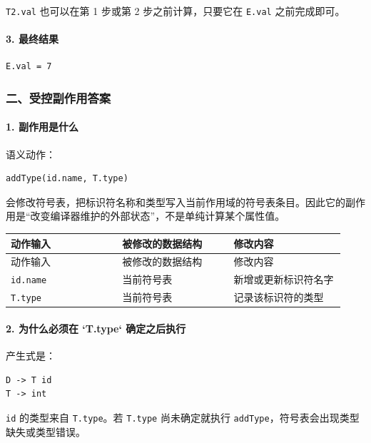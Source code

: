 \documentclass[UTF8]{ctexart}
\begin{document}
\texttt{T2.val} 也可以在第 1 步或第 2 步之前计算，只要它在 \texttt{E.val} 之前完成即可。

\paragraph*{3. 最终结果}

\begin{Verbatim}[fontsize=\small,breaklines=true]
E.val = 7
\end{Verbatim}

\subsubsection*{二、受控副作用答案}

\paragraph*{1. 副作用是什么}

语义动作：

\begin{Verbatim}[fontsize=\small,breaklines=true]
addType(id.name, T.type)
\end{Verbatim}

会修改符号表，把标识符名称和类型写入当前作用域的符号表条目。因此它的副作用是“改变编译器维护的外部状态”，不是单纯计算某个属性值。

\begin{longtable}{|p{0.31\linewidth}|p{0.31\linewidth}|p{0.31\linewidth}|}
\hline
动作输入 & 被修改的数据结构 & 修改内容 \\
\hline
\endfirsthead
动作输入 & 被修改的数据结构 & 修改内容 \\
\hline
\endhead
\texttt{id.name} & 当前符号表 & 新增或更新标识符名字 \\
\hline
\texttt{T.type} & 当前符号表 & 记录该标识符的类型 \\
\hline
\end{longtable}

\paragraph*{2. 为什么必须在 `T.type` 确定之后执行}

产生式是：

\begin{Verbatim}[fontsize=\small,breaklines=true]
D -> T id
T -> int
\end{Verbatim}

\texttt{id} 的类型来自 \texttt{T.type}。若 \texttt{T.type} 尚未确定就执行 \texttt{addType}，符号表会出现类型缺失或类型错误。
\end{document}
